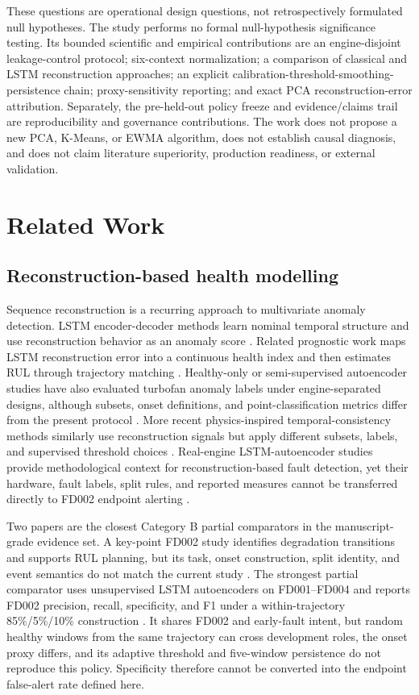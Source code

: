 \documentclass[11pt]{article}
\begin{document}
These questions are operational design questions, not retrospectively formulated null hypotheses. The study performs no formal null-hypothesis significance testing. Its bounded scientific and empirical contributions are an engine-disjoint leakage-control protocol; six-context normalization; a comparison of classical and LSTM reconstruction approaches; an explicit calibration-threshold-smoothing-persistence chain; proxy-sensitivity reporting; and exact PCA reconstruction-error attribution. Separately, the pre-held-out policy freeze and evidence/claims trail are reproducibility and governance contributions. The work does not propose a new PCA, K-Means, or EWMA algorithm, does not establish causal diagnosis, and does not claim literature superiority, production readiness, or external validation.


\section{Related Work}


\subsection{Reconstruction-based health modelling}


Sequence reconstruction is a recurring approach to multivariate anomaly detection. LSTM encoder-decoder methods learn nominal temporal structure and use reconstruction behavior as an anomaly score \citep{core005}. Related prognostic work maps LSTM reconstruction error into a continuous health index and then estimates RUL through trajectory matching \citep{core006}. Healthy-only or semi-supervised autoencoder studies have also evaluated turbofan anomaly labels under engine-separated designs, although subsets, onset definitions, and point-classification metrics differ from the present protocol \citep{core007}. More recent physics-inspired temporal-consistency methods similarly use reconstruction signals but apply different subsets, labels, and supervised threshold choices \citep{core012}. Real-engine LSTM-autoencoder studies provide methodological context for reconstruction-based fault detection, yet their hardware, fault labels, split rules, and reported measures cannot be transferred directly to FD002 endpoint alerting \citep{core051}.


Two papers are the closest Category B partial comparators in the manuscript-grade evidence set. A key-point FD002 study identifies degradation transitions and supports RUL planning, but its task, onset construction, split identity, and event semantics do not match the current study \citep{core010}. The strongest partial comparator uses unsupervised LSTM autoencoders on FD001--FD004 and reports FD002 precision, recall, specificity, and F1 under a within-trajectory 85\%/5\%/10\% construction \citep{core013}. It shares FD002 and early-fault intent, but random healthy windows from the same trajectory can cross development roles, the onset proxy differs, and its adaptive threshold and five-window persistence do not reproduce this policy. Specificity therefore cannot be converted into the endpoint false-alert rate defined here.
\end{document}
